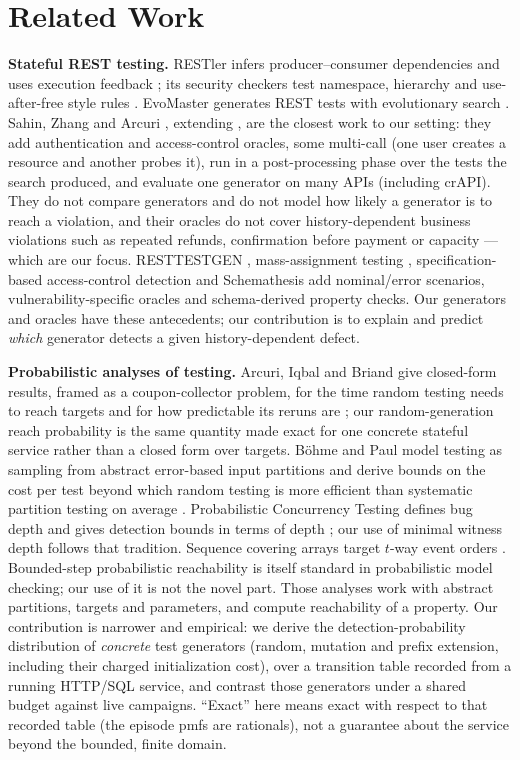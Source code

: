 \documentclass[conference]{IEEEtran}
\begin{document}
\section{Related Work}
\textbf{Stateful REST testing.} RESTler infers producer--consumer dependencies and uses
execution feedback \cite{r9}; its security checkers test namespace, hierarchy and
use-after-free style rules \cite{r11}. EvoMaster generates REST tests with evolutionary
search \cite{r24}. Sahin, Zhang and Arcuri \cite{r19}, extending \cite{r27}, are the
closest work to our setting: they add authentication and access-control oracles, some
multi-call (one user creates a resource and another probes it), run in a post-processing
phase over the tests the search produced, and evaluate one generator on many APIs
(including crAPI). They do not compare generators and do not model how likely a generator
is to reach a violation, and their oracles do not cover history-dependent business
violations such as repeated refunds, confirmation before payment or capacity --- which
are our focus. RESTTESTGEN \cite{r12}, mass-assignment testing \cite{r13},
specification-based access-control detection \cite{r18} and Schemathesis \cite{r25} add
nominal/error scenarios, vulnerability-specific oracles and schema-derived property
checks. Our generators and oracles have these antecedents; our contribution is to explain
and predict \emph{which} generator detects a given history-dependent defect.

\textbf{Probabilistic analyses of testing.} Arcuri, Iqbal and Briand give closed-form
results, framed as a coupon-collector problem, for the time random testing needs to reach
targets and for how predictable its reruns are \cite{r21}; our random-generation reach
probability is the same quantity made exact for one concrete stateful service rather than
a closed form over targets. B\"ohme and Paul model testing as sampling from abstract
error-based input partitions and derive bounds on the cost per test beyond which random
testing is more efficient than systematic partition testing on average \cite{r22}.
Probabilistic Concurrency Testing defines bug depth and gives detection bounds in terms
of depth \cite{r20}; our use of minimal witness depth follows that tradition. Sequence
covering arrays target $t$-way event orders \cite{r26}. Bounded-step probabilistic
reachability is itself standard in probabilistic model checking; our use of it is not the
novel part. Those analyses work with abstract partitions, targets and parameters, and
compute reachability of a property. Our contribution is narrower and empirical: we derive
the detection-probability distribution of \emph{concrete} test generators (random, mutation
and prefix extension, including their charged initialization cost), over a transition table
recorded from a running HTTP/SQL service, and contrast those generators under a shared
budget against live campaigns. ``Exact'' here means exact with respect to that recorded
table (the episode pmfs are rationals), not a guarantee about the service beyond the
bounded, finite domain.
\end{document}
